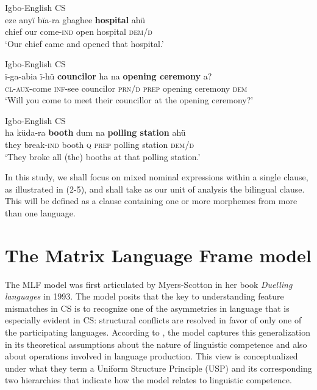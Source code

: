 \documentclass[output=paper]{langsci/langscibook}
\begin{document}
\ea
{Igbo-English \textsc{CS}}\\
\gll   eze  anyï  bïa-ra        gbaghee  \textbf{hospital}  ahü \textbf{} \\
       chief   our  come-\textsc{ind}  open        hospital  \textsc{dem/d}\\
\glt   ‘Our chief came and opened that hospital.’
\z

\ea
{Igbo-English \textsc{CS}}\\
\gll   ï-ga-abia  ï-hü  \textbf{councilor}  ha  na  \textbf{opening ceremony} a?\\
     \textsc{  cl-aux}-come  \textsc{inf}-see  councilor  \textsc{prn/d}  \textsc{prep}  opening ceremony \textsc{dem}\\
\glt   ‘Will you come to meet their councillor at the opening ceremony?’
\z

\ea
{Igbo-English \textsc{CS}}\\
\gll ha    küda-ra     \textbf{booth} dum   na    \textbf{polling station} ahü\\
     they break-\textsc{ind}  booth  \textsc{q}  \textsc{prep}  polling station   \textsc{dem/d}\\
\glt ‘They broke all (the) booths at that polling station.’ \textsubscript{}  
\z

In this study, we shall focus on mixed nominal expressions within a single clause, as illustrated in (2-5), and shall take as our unit of analysis the bilingual clause. This will be defined as a clause containing one or more morphemes from more than one language.

\section{The Matrix Language Frame model}

The MLF model was first articulated by Myers-Scotton in her book \textit{Duelling languages} in 1993. The model posits that the key to understanding feature mismatches in CS is to recognize one of the asymmetries in language that is especially evident in CS: structural conflicts are resolved in favor of only one of the participating languages. According to \citet[72]{JakeEtAl2002}, the model captures this generalization in its theoretical assumptions about the nature of linguistic competence and also about operations involved in language production. This view is conceptualized under what they term a Uniform Structure Principle (USP) and its corresponding two hierarchies that indicate how the model relates to linguistic competence. 
\end{document}
